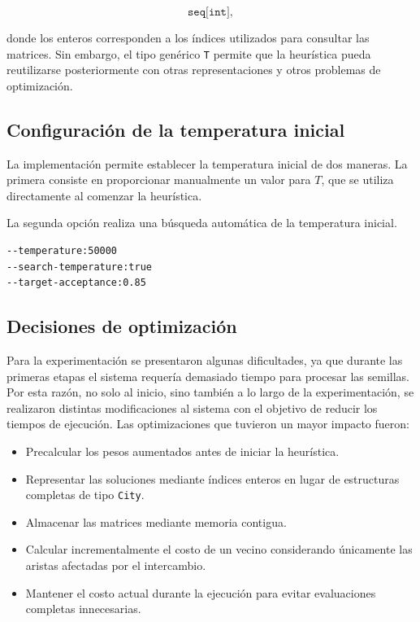 \documentclass[twoside,11pt]{article}
\begin{document}
\[
\texttt{seq[int]},
\]

donde los enteros corresponden a los índices utilizados para consultar las matrices. Sin embargo, el tipo genérico \texttt{T} permite que la heurística pueda reutilizarse posteriormente con otras representaciones y otros problemas de optimización.

\subsection{Configuración de la temperatura inicial}

La implementación permite establecer la temperatura inicial de dos maneras. La primera consiste en proporcionar manualmente un valor para $T$, que se
utiliza directamente al comenzar la heurística.

La segunda opción realiza una búsqueda automática de la temperatura inicial. 

\begin{verbatim}
--temperature:50000
--search-temperature:true
--target-acceptance:0.85
\end{verbatim}

\subsection{Decisiones de optimización}

Para la experimentación se presentaron algunas dificultades, ya que durante las primeras etapas el sistema requería demasiado tiempo para procesar las
semillas. Por esta razón, no solo al inicio, sino también a lo largo de la experimentación, se realizaron distintas modificaciones al sistema con el objetivo de reducir los tiempos de ejecución. Las optimizaciones que tuvieron un mayor impacto fueron:

\begin{itemize}
    \setlength{\itemsep}{1pt}
    \setlength{\parskip}{0pt}
    \setlength{\parsep}{0pt}

    \item Precalcular los pesos aumentados antes de iniciar la heurística.
    \item Representar las soluciones mediante índices enteros en lugar de  estructuras completas de tipo \texttt{City}.
    \item Almacenar las matrices mediante memoria contigua.
    \item Calcular incrementalmente el costo de un vecino considerando únicamente las aristas afectadas por el intercambio.
    \item Mantener el costo actual durante la ejecución para evitar evaluaciones completas innecesarias.
\end{itemize}
\end{document}
